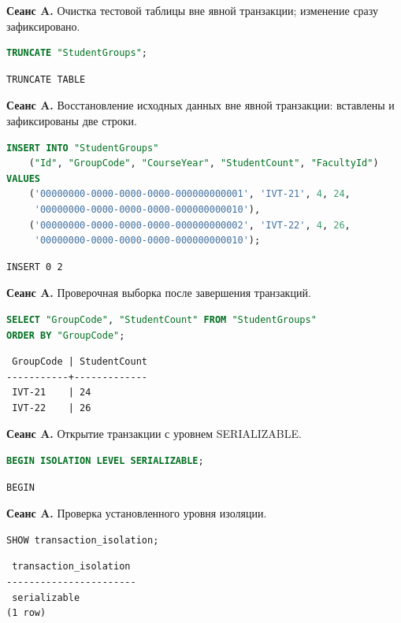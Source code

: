 \documentclass[12pt,a4paper]{article}
\begin{document}
\textbf{Сеанс A.} Очистка тестовой таблицы вне явной транзакции; изменение сразу зафиксировано.
\begin{lstlisting}[language=SQL]
TRUNCATE "StudentGroups";
\end{lstlisting}

\begin{lstlisting}
TRUNCATE TABLE
\end{lstlisting}

\textbf{Сеанс A.} Восстановление исходных данных вне явной транзакции: вставлены и зафиксированы две строки.
\begin{lstlisting}[language=SQL]
INSERT INTO "StudentGroups"
    ("Id", "GroupCode", "CourseYear", "StudentCount", "FacultyId")
VALUES
    ('00000000-0000-0000-0000-000000000001', 'IVT-21', 4, 24,
     '00000000-0000-0000-0000-000000000010'),
    ('00000000-0000-0000-0000-000000000002', 'IVT-22', 4, 26,
     '00000000-0000-0000-0000-000000000010');
\end{lstlisting}

\begin{lstlisting}
INSERT 0 2
\end{lstlisting}

\textbf{Сеанс A.} Проверочная выборка после завершения транзакций.
\begin{lstlisting}[language=SQL]
SELECT "GroupCode", "StudentCount" FROM "StudentGroups"
ORDER BY "GroupCode";
\end{lstlisting}

\begin{lstlisting}
 GroupCode | StudentCount
-----------+-------------
 IVT-21    | 24
 IVT-22    | 26
\end{lstlisting}

\textbf{Сеанс A.} Открытие транзакции с уровнем SERIALIZABLE.
\begin{lstlisting}[language=SQL]
BEGIN ISOLATION LEVEL SERIALIZABLE;
\end{lstlisting}

\begin{lstlisting}
BEGIN
\end{lstlisting}

\textbf{Сеанс A.} Проверка установленного уровня изоляции.
\begin{lstlisting}[language=SQL]
SHOW transaction_isolation;
\end{lstlisting}

\begin{lstlisting}
 transaction_isolation
-----------------------
 serializable
(1 row)
\end{lstlisting}
\end{document}
